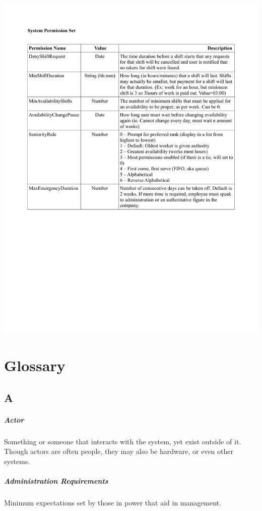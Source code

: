 \documentclass[letterpaper,12pt]{report}
\begin{document}
\newpage
\includegraphics[scale=0.8, trim=20mm 0mm 0mm 0mm]{externals/PermissionTable4.pdf}


\chapter{Glossary}
\setlength\parskip{0mm}
\section*{A}
\paragraph{Actor} Something or someone that interacts with the system, yet exist outside of it.  Though actors are often people, they may also be hardware, or even other systems.
\paragraph{Administration Requirements} Minimum expectations set by those in power that aid in management.
\end{document}
